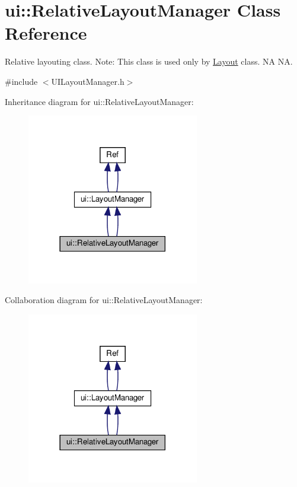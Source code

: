 \hypertarget{classui_1_1RelativeLayoutManager}{}\section{ui\+:\+:Relative\+Layout\+Manager Class Reference}
\label{classui_1_1RelativeLayoutManager}


Relative layouting class. Note\+: This class is used only by {\ttfamily \hyperlink{classui_1_1Layout}{Layout}} class.  NA  NA.  




{\ttfamily \#include $<$U\+I\+Layout\+Manager.\+h$>$}



Inheritance diagram for ui\+:\+:Relative\+Layout\+Manager\+:
\nopagebreak
\begin{figure}[H]
\begin{center}
\leavevmode
\includegraphics[width=213pt]{classui_1_1RelativeLayoutManager__inherit__graph}
\end{center}
\end{figure}


Collaboration diagram for ui\+:\+:Relative\+Layout\+Manager\+:
\nopagebreak
\begin{figure}[H]
\begin{center}
\leavevmode
\includegraphics[width=213pt]{classui_1_1RelativeLayoutManager__coll__graph}
\end{center}
\end{figure}
